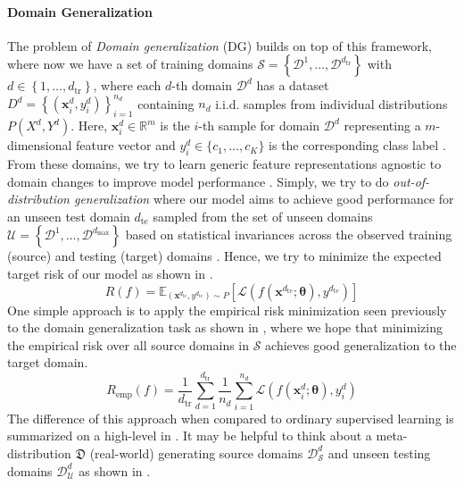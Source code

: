 \paragraph{Domain Generalization}
The problem of \emph{Domain generalization} (DG) builds on top of this framework, where now we have a set of training domains $\mathcal{S} = \left\{\mathcal{D}^{1}, \ldots, \mathcal{D}^{d_{\mathrm{tr}}}\right\}$ with $d \in\left\{1, \ldots, d_{\mathrm{tr}}\right\}$, where each $d$-th domain $\mathcal{D}^d$ has a dataset $D^{d}=\left\{\left(\mathbf{x}_{i}^{d}, y_{i}^{d}\right)\right\}_{i=1}^{n_{d}}$ containing $n_d$ i.i.d. samples from individual distributions $P\left(X^{d}, Y^{d}\right)$. Here, $\mathbf{x}_i^d \in \mathbb{R}^{m}$ is the $i$-th sample for domain $\mathcal{D}^d$ representing a $m$-dimensional feature vector and $y_i^d \in\{c_1,\dots , c_K\}$ is the corresponding class label \citep{wang2020learning}. From these domains, we try to learn generic feature representations agnostic to domain changes to improve model performance \citep{seo2019learning}. Simply, we try to do \emph{out-of-distribution generalization} where our model aims to achieve good performance for an unseen test domain $d_\mathrm{te}$ sampled from the set of unseen domains $\mathcal{U} = \left\{\mathcal{D}^{1}, \ldots, \mathcal{D}^{d_{\mathrm{max}}}\right\}$ based on statistical invariances across the observed training (source) and testing (target) domains \citep{gulrajani2020search, huang2020selfchallenging}. Hence, we try to minimize the expected target risk of our model as shown in .
\begin{equation}
\label{eq:domain_risk}
    R(f) = \mathbb{E}_{(\mathbf{x}^{d_{\mathrm{te}}}, y^{d_{\mathrm{te}}}) \sim P}[\mathcal{L}(f(\mathbf{x}^{d_{\mathrm{te}}}; \boldsymbol{\theta}), y^{d_{\mathrm{te}}})]
\end{equation}
One simple approach is to apply the empirical risk minimization seen previously to the domain generalization task as shown in , where we hope that minimizing the empirical risk over all source domains in $\mathcal{S}$ achieves good generalization to the target domain.
\begin{equation}
\label{eq:domain_risk_emp}
    R_\mathrm{emp}(f) = \frac{1}{d_\mathrm{tr}} \sum_{d=1}^{d_\mathrm{tr}} \frac{1}{n_d} \sum_{i=1}^{n_d} \mathcal{L}(f(\mathbf{x}_i^{d}; \boldsymbol{\theta}), y_i^{d})
\end{equation}
The difference of this approach when compared to ordinary supervised learning is summarized on a high-level in . It may be helpful to think about a meta-distribution $\mathfrak{D}$ (real-world) generating source domains $\mathcal{D}^d_\mathcal{S}$ and unseen testing domains $\mathcal{D}^d_\mathcal{U}$ as shown in .
